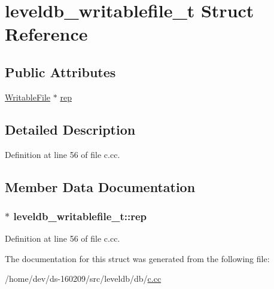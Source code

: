 \hypertarget{structleveldb__writablefile__t}{}\section{leveldb\+\_\+writablefile\+\_\+t Struct Reference}
\label{structleveldb__writablefile__t}
\subsection*{Public Attributes}
\begin{DoxyCompactItemize}
\item 
\hyperlink{classleveldb_1_1_writable_file}{Writable\+File} $\ast$ \hyperlink{structleveldb__writablefile__t_a3cf7e2a9ac0560d667deee9d574d7761}{rep}
\end{DoxyCompactItemize}


\subsection{Detailed Description}


Definition at line 56 of file c.\+cc.



\subsection{Member Data Documentation}
\hypertarget{structleveldb__writablefile__t_a3cf7e2a9ac0560d667deee9d574d7761}{}
\subsubsection[{rep}]{$\ast$ leveldb\+\_\+writablefile\+\_\+t\+::rep}\label{structleveldb__writablefile__t_a3cf7e2a9ac0560d667deee9d574d7761}


Definition at line 56 of file c.\+cc.



The documentation for this struct was generated from the following file\+:\begin{DoxyCompactItemize}
\item 
/home/dev/ds-\/160209/src/leveldb/db/\hyperlink{c_8cc}{c.\+cc}\end{DoxyCompactItemize}
